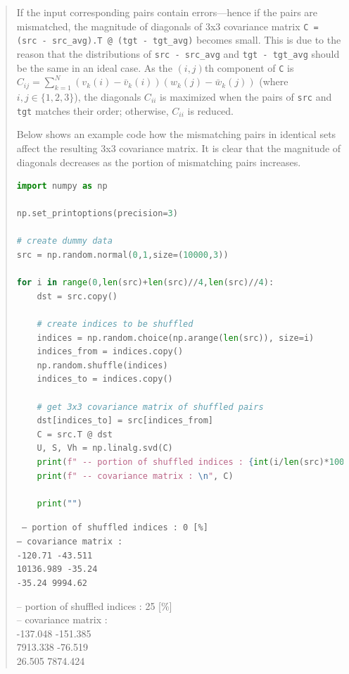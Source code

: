 \documentclass[11pt]{article}
\begin{document}
\begin{quote}
If the input corresponding pairs contain errors---hence if the pairs are mismatched, the magnitude of diagonals of 3x3 covariance matrix \texttt{C = (src - src\_avg).T @ (tgt - tgt\_avg)} becomes small. This is due to the reason that the distributions of \texttt{src - src\_avg} and \texttt{tgt - tgt\_avg} should be the same in an ideal case. As the $(i,j)$th component of \texttt{C} is $C_{ij} = \sum_{k=1}^{N}(v_{k}(i)-\bar{v}_k(i))(w_{k}(j)-\bar{w}_k(j))$ (where $i,j \in \{ 1,2,3 \}$), the diagonals $C_{ii}$ is maximized when the pairs of \texttt{src} and \texttt{tgt} matches their order; otherwise, $C_{ii}$ is reduced. 

Below shows an example code how the mismatching pairs in identical sets affect the resulting 3x3 covariance matrix. It is clear that the magnitude of diagonals decreases as the portion of mismatching pairs increases.

\begin{lstlisting}[language=Python, basicstyle=\scriptsize]
import numpy as np

np.set_printoptions(precision=3)

# create dummy data
src = np.random.normal(0,1,size=(10000,3))

for i in range(0,len(src)+len(src)//4,len(src)//4):
    dst = src.copy()

    # create indices to be shuffled
    indices = np.random.choice(np.arange(len(src)), size=i)
    indices_from = indices.copy()
    np.random.shuffle(indices)
    indices_to = indices.copy()

    # get 3x3 covariance matrix of shuffled pairs
    dst[indices_to] = src[indices_from]
    C = src.T @ dst
    U, S, Vh = np.linalg.svd(C)
    print(f" -- portion of shuffled indices : {int(i/len(src)*100)} [%]")
    print(f" -- covariance matrix : \n", C)

    print("")
\end{lstlisting}

{\tt
-- portion of shuffled indices : 0 [\%] \\
-- covariance matrix : \\
\lbrack {}  -120.71    -43.511 \rbrack \\
  10136.989   -35.24 \rbrack \\
   -35.24   9994.62 \rbrack\rbrack

-- portion of shuffled indices : 25 [\%] \\
-- covariance matrix : \\
\lbrack {} -137.048 -151.385 \rbrack \\
 7913.338  -76.519 \rbrack \\
    26.505 7874.424 \rbrack \rbrack

}
\end{quote}
\end{document}
